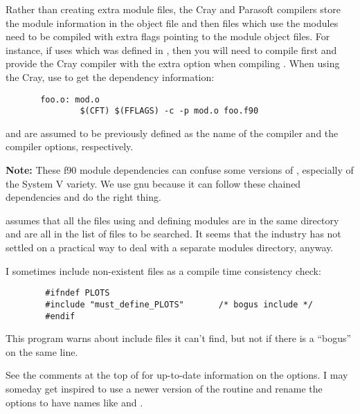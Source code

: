 Rather than creating extra module files,
the Cray and Parasoft compilers store the module information in the
object file and then files which use the modules need to be compiled
with extra flags pointing to the module object files.  For instance, if
 uses  which was defined in
, then you will need to compile  first and
provide the Cray compiler with the extra option  when
compiling .  When using the Cray, use  to get the dependency information:
\begin{verbatim}
       foo.o: mod.o
               $(CFT) $(FFLAGS) -c -p mod.o foo.f90
\end{verbatim}
 and  are assumed to be previously
defined as the name of the compiler and the compiler options,
respectively.

{\bf Note:} These f90 module dependencies can confuse some versions of
, especially of the System V variety.  We use gnu
 because it can follow these chained dependencies and do the
right thing.

 assumes that all the files using and defining
modules are in the same directory and are all in the list of
files to be searched.  It seems that the industry has not
settled on a practical way to deal with a separate modules
directory, anyway.

I sometimes include non-existent files as a compile time
consistency check:
\begin{verbatim}
        #ifndef PLOTS
        #include "must_define_PLOTS"       /* bogus include */
        #endif
\end{verbatim}
This program warns about include files it can't find, but
not if there is a ``bogus'' on the same line.

See the comments at the top of  for up-to-date
information on the options.  I may someday get inspired to use a
newer version of the  routine and rename the options
to have names like  and .
